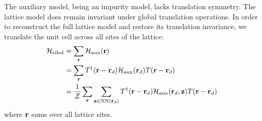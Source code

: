 \documentclass[reprint,hidelinks,onecolumn]{revtex4-2}
\begin{document}
The auxiliary model, being an impurity model, lacks translation symmetry. The lattice model does remain invariant under global translation operations. In order to reconstruct the full lattice model and restore its translation invariance, we translate the unit cell across all sites of the lattice:
\begin{equation}\begin{aligned}
	\label{tilingPrescription}
	\mathcal{H}_\text{tiled} &= \sum_{{\bf r}}\mathcal{H}_\text{aux}({\bf r})\\
				&= \sum_{{\bf r}}T^\dagger({\bf r} - {\bf r}_d)\mathcal{H}_\text{aux}({\bf r}_d)T({\bf r} - {\bf r}_d)~ \\
				&= \frac{1}{\mathcal{Z}}\sum_{{\bf r}}\sum_{{\bf z}\in\text{NN}({\bf r}_d)}T^\dagger({\bf r} - {\bf r}_d)\mathcal{H}_\text{aux}({\bf r}_d, {\bf z})T({\bf r} - {\bf r}_d)~ \\
\end{aligned}\end{equation}
where \({\bf r}\) sums over all lattice sites.
\end{document}
